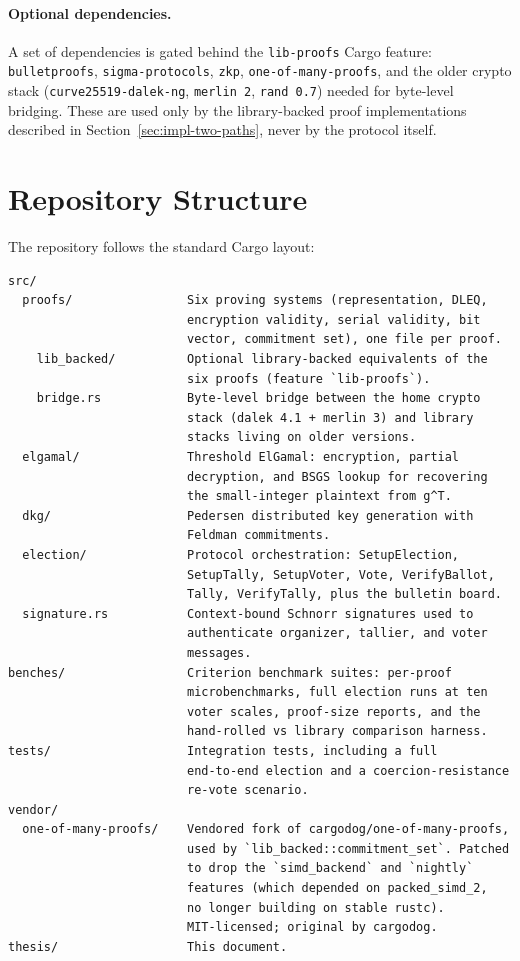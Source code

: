 \documentclass[12pt,a4paper,oneside]{report}
\begin{document}
\paragraph{Optional dependencies.}
A set of dependencies is gated behind the \texttt{lib-proofs} Cargo 
feature: \texttt{bulletproofs}, \texttt{sigma-protocols}, \texttt{zkp}, 
\texttt{one-of-many-proofs}, and the older crypto stack (\texttt{curve25519-dalek-ng}, 
\texttt{merlin 2}, \texttt{rand 0.7}) needed for byte-level bridging. 
These are used only by the library-backed proof implementations described 
in Section~\ref{sec:impl-two-paths}, never by the protocol itself.

\section{Repository Structure}
\label{sec:impl-layout}

The repository follows the standard Cargo layout:

\begin{verbatim}
src/
  proofs/                Six proving systems (representation, DLEQ,
                         encryption validity, serial validity, bit
                         vector, commitment set), one file per proof.
    lib_backed/          Optional library-backed equivalents of the
                         six proofs (feature `lib-proofs`).
    bridge.rs            Byte-level bridge between the home crypto
                         stack (dalek 4.1 + merlin 3) and library
                         stacks living on older versions.
  elgamal/               Threshold ElGamal: encryption, partial
                         decryption, and BSGS lookup for recovering
                         the small-integer plaintext from g^T.
  dkg/                   Pedersen distributed key generation with
                         Feldman commitments.
  election/              Protocol orchestration: SetupElection,
                         SetupTally, SetupVoter, Vote, VerifyBallot,
                         Tally, VerifyTally, plus the bulletin board.
  signature.rs           Context-bound Schnorr signatures used to
                         authenticate organizer, tallier, and voter
                         messages.
benches/                 Criterion benchmark suites: per-proof
                         microbenchmarks, full election runs at ten
                         voter scales, proof-size reports, and the
                         hand-rolled vs library comparison harness.
tests/                   Integration tests, including a full
                         end-to-end election and a coercion-resistance
                         re-vote scenario.
vendor/
  one-of-many-proofs/    Vendored fork of cargodog/one-of-many-proofs,
                         used by `lib_backed::commitment_set`. Patched
                         to drop the `simd_backend` and `nightly`
                         features (which depended on packed_simd_2,
                         no longer building on stable rustc).
                         MIT-licensed; original by cargodog.
thesis/                  This document.
\end{verbatim}
\end{document}
